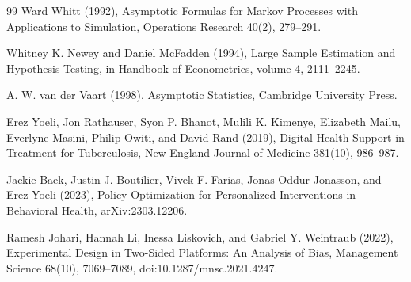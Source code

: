\documentclass{article}
\begin{document}
\begin{thebibliography}{99}
   Ward Whitt (1992), Asymptotic Formulas for Markov Processes with Applications to Simulation, Operations Research 40(2), 279--291.

   Whitney K. Newey and Daniel McFadden (1994), Large Sample Estimation and Hypothesis Testing, in Handbook of Econometrics, volume 4, 2111--2245.

   A. W. van der Vaart (1998), Asymptotic Statistics, Cambridge University Press.

   Erez Yoeli, Jon Rathauser, Syon P. Bhanot, Mulili K. Kimenye, Elizabeth Mailu, Everlyne Masini, Philip Owiti, and David Rand (2019), Digital Health Support in Treatment for Tuberculosis, New England Journal of Medicine 381(10), 986--987.

   Jackie Baek, Justin J. Boutilier, Vivek F. Farias, Jonas Oddur Jonasson, and Erez Yoeli (2023), Policy Optimization for Personalized Interventions in Behavioral Health, arXiv:2303.12206.

   Ramesh Johari, Hannah Li, Inessa Liskovich, and Gabriel Y. Weintraub (2022), Experimental Design in Two-Sided Platforms: An Analysis of Bias, Management Science 68(10), 7069--7089, doi:10.1287/mnsc.2021.4247.

\end{thebibliography}
\end{document}
